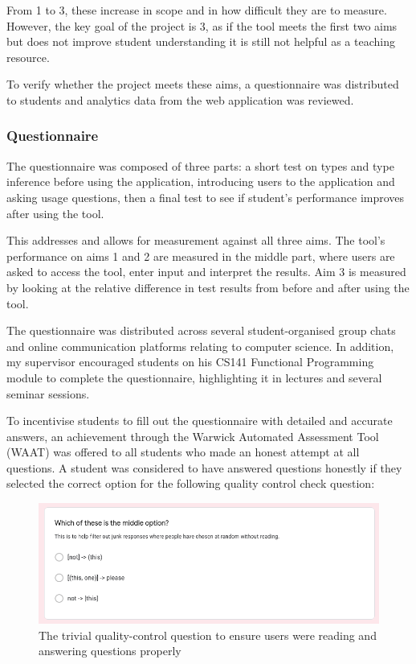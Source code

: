 \documentclass[a4paper,fleqn,12pt]{article}
\begin{document}
From 1 to 3, these increase in scope and in how difficult they are to measure. However, the key goal of the project is 3, as if the tool meets the first two aims but does not improve student understanding it is still not helpful as a teaching resource.

To verify whether the project meets these aims, a questionnaire was distributed to students and analytics data from the web application was reviewed.
\subsubsection{Questionnaire}\label{id:h.yqiowsgjmohq}
The questionnaire was composed of three parts: a short test on types and type inference before using the application, introducing users to the application and asking usage questions, then a final test to see if student’s performance improves after using the tool.

This addresses and allows for measurement against all three aims. The tool’s performance on aims 1 and 2 are measured in the middle part, where users are asked to access the tool, enter input and interpret the results. Aim 3 is measured by looking at the relative difference in test results from before and after using the tool.

The questionnaire was distributed across several student-organised group chats and online communication platforms relating to computer science. In addition, my supervisor encouraged students on his CS141 Functional Programming module to complete the questionnaire, highlighting it in lectures and several seminar sessions.

To incentivise students to fill out the questionnaire with detailed and accurate answers, an achievement through the Warwick Automated Assessment Tool (WAAT) was offered to all students who made an honest attempt at all questions. A student was considered to have answered questions honestly if they selected the correct option for the following quality control check question:

{\centering \begin{figure}[h!]
  \centering
  \includegraphics[width=0.882\linewidth]{images/image26.png}
  \caption{The trivial quality-control question to ensure users were reading and answering questions properly}
\end{figure} \par}
\end{document}
